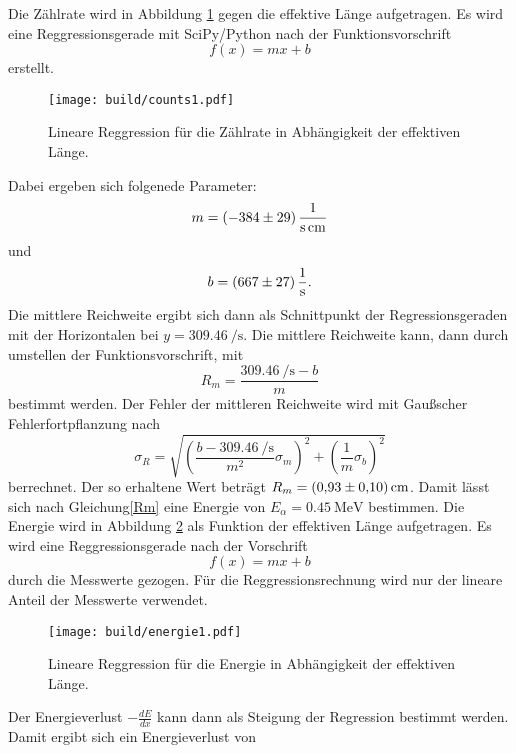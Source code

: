 \noindent Die Zählrate wird in Abbildung \ref{fig:c1} gegen die effektive Länge aufgetragen.
Es wird eine Reggressionsgerade mit SciPy/Python nach der Funktionsvorschrift
\begin{equation*}
  f(x) = mx +b
\end{equation*}
erstellt.
\begin{figure}[H]
  \centering
  \texttt{[image: build/counts1.pdf]}
  \caption{Lineare Reggression für die Zählrate in Abhängigkeit der effektiven Länge.}
  \label{fig:c1}
\end{figure}
\noindent Dabei ergeben sich folgenede Parameter:
\begin{equation*}
  m =\SI{-384\pm29}{\per\second\per\centi\meter}
\end{equation*}
und
\begin{equation*}
  b =\SI{667\pm27}{\per\second}.
\end{equation*}
Die mittlere Reichweite ergibt sich dann als Schnittpunkt der Regressionsgeraden mit der Horizontalen bei $y=\SI{309.46}{\per\second}$.
Die mittlere Reichweite kann, dann durch umstellen der Funktionsvorschrift, mit
\begin{equation*}
  R_m=\frac{\SI{309.46}{\per\second}-b}{m}
\end{equation*}
bestimmt werden.
Der Fehler der mittleren Reichweite wird mit Gaußscher Fehlerfortpflanzung nach
\begin{equation*}
  \sigma_R = \sqrt{\left(\frac{b-\SI{309.46}{\per\second}}{m^2}\sigma_m\right)^2 +\left(\frac{1}{m}\sigma_b\right)^2}
\end{equation*}
berrechnet.
Der so erhaltene Wert beträgt $R_m= \SI{0.93\pm0.1}{\centi\meter}$.
Damit lässt sich nach Gleichung\eqref{Rm} eine Energie von $E_{\alpha} = \SI{0.45}{\mega\electronvolt}$ bestimmen.
Die Energie wird in Abbildung \ref{fig:e1} als Funktion der effektiven Länge aufgetragen.
Es wird eine Reggressionsgerade nach der Vorschrift
\begin{equation*}
  f(x) = mx + b
\end{equation*}
durch die Messwerte gezogen.
Für die Reggressionsrechnung wird nur der lineare Anteil der Messwerte verwendet.
\begin{figure}[H]
  \centering
  \texttt{[image: build/energie1.pdf]}
  \caption{Lineare Reggression für die Energie in Abhängigkeit der effektiven Länge.}
  \label{fig:e1}
\end{figure}
\noindent Der Energieverlust $-\frac{dE}{dx}$ kann dann als Steigung der Regression bestimmt werden.
Damit ergibt sich ein Energieverlust von
